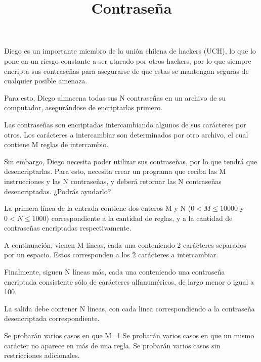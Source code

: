 \documentclass{oci}
\title{Contraseña}
\begin{document}
\begin{problemDescription}
  Diego es un importante miembro de la unión chilena de hackers (UCH), lo que lo pone en un riesgo constante a ser atacado por otros hackers, por lo que siempre encripta sus contraseñas para asegurarse de que estas se mantengan seguras de cualquier posible amenaza.

  Para esto, Diego almacena todas sus N contraseñas en un archivo de su computador, asegurándose de encriptarlas primero.

  Las contraseñas son encriptadas intercambiando algunos de sus carácteres por otros. Los carácteres a intercambiar son determinados por otro archivo, el cual contiene M reglas de intercambio.

  Sin embargo, Diego necesita poder utilizar sus contraseñas, por lo que tendrá que desencriptarlas. Para esto, necesita crear un programa que reciba las M instrucciones y las N contraseñas, y deberá retornar las N contraseñas desencriptadas. ¿Podrás ayudarlo?
\end{problemDescription}

\begin{inputDescription}
  La primera línea de la entrada contiene dos enteros M y N ($0 < M \leq 10000$ y $0 < N \leq 1000$) correspondiente a la cantidad de reglas, y a la cantidad de contraseñas encriptadas respectivamente.

  A continuación, vienen M líneas, cada una conteniendo 2 carácteres separados por un espacio. Estos corresponden a los 2 carácteres a intercambiar.

  Finalmente, siguen N líneas más, cada una conteniendo una contraseña encriptada consistente sólo de carácteres alfanuméricos, de largo menor o igual a 100.
\end{inputDescription}

\begin{outputDescription}
  La salida debe contener N lineas, con cada linea correspondiendo a la contraseña desencriptada correspondiente.
\end{outputDescription}

\begin{scoreDescription}
  Se probarán varios casos en que M=1
  Se probarán varios casos en que un mismo carácter no aparece en más de una regla.
  Se probarán varios casos sin restricciones adicionales.
\end{scoreDescription}

\begin{sampleDescription}
\end{sampleDescription}
\end{document}
